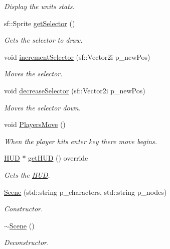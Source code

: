 \begin{DoxyCompactItemize}
\begin{DoxyCompactList}\small\item\em Display the units stats. \end{DoxyCompactList}\item 
\mbox{\label{class_scene_af2908989883758468fc2add26b3637e6}} 
sf\+::\+Sprite \mbox{\hyperlink{class_scene_af2908989883758468fc2add26b3637e6}{get\+Selector}} ()
\begin{DoxyCompactList}\small\item\em Gets the selector to draw. \end{DoxyCompactList}\item 
\mbox{\label{class_scene_ac8eec69b021a9cd85f39aaaeb9de8785}} 
void \mbox{\hyperlink{class_scene_ac8eec69b021a9cd85f39aaaeb9de8785}{increment\+Selector}} (sf\+::\+Vector2i p\+\_\+new\+Pos)
\begin{DoxyCompactList}\small\item\em Moves the selector. \end{DoxyCompactList}\item 
void \mbox{\hyperlink{class_scene_a2b3d2bde3505a1626ad5c8435025e9fc}{decrease\+Selector}} (sf\+::\+Vector2i p\+\_\+new\+Pos)
\begin{DoxyCompactList}\small\item\em Moves the selector down. \end{DoxyCompactList}\item 
void \mbox{\hyperlink{class_scene_a33e61bb927aa8a3e1070a907ffff24a5}{Players\+Move}} ()
\begin{DoxyCompactList}\small\item\em When the player hits enter key there move begins. \end{DoxyCompactList}\item 
\mbox{\label{class_scene_a3ebc1a157e63088eb47ff6cea6dd6d56}} 
\mbox{\hyperlink{class_h_u_d}{H\+UD}} $\ast$ \mbox{\hyperlink{class_scene_a3ebc1a157e63088eb47ff6cea6dd6d56}{get\+H\+UD}} () override
\begin{DoxyCompactList}\small\item\em Gets the \mbox{\hyperlink{class_h_u_d}{H\+UD}}. \end{DoxyCompactList}\item 
\mbox{\label{class_scene_a8a67c7ff953a4808b45981f8a40bafa3}} 
\mbox{\hyperlink{class_scene_a8a67c7ff953a4808b45981f8a40bafa3}{Scene}} (std\+::string p\+\_\+characters, std\+::string p\+\_\+nodes)
\begin{DoxyCompactList}\small\item\em Constructor. \end{DoxyCompactList}\item 
\mbox{\hyperlink{class_scene_a3b8cec2e32546713915f8c6303c951f1}{$\sim$\+Scene}} ()
\begin{DoxyCompactList}\small\item\em Deconstructor. \end{DoxyCompactList}\end{DoxyCompactItemize}
